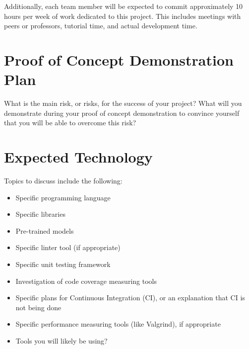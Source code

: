 \documentclass{article}
\begin{document}
\noindent
Additionally, each team member will be expected to commit approximately 10 hours per week of work dedicated to this project. This includes meetings with peers or professors, tutorial time, and actual development time.


\section{Proof of Concept Demonstration Plan}

What is the main risk, or risks, for the success of your project?  What will you
demonstrate during your proof of concept demonstration to convince yourself that
you will be able to overcome this risk?

\section{Expected Technology}



Topics to discuss include the following:

\begin{itemize}
\item Specific programming language
\item Specific libraries
\item Pre-trained models
\item Specific linter tool (if appropriate)
\item Specific unit testing framework
\item Investigation of code coverage measuring tools
\item Specific plans for Continuous Integration (CI), or an explanation that CI
  is not being done
\item Specific performance measuring tools (like Valgrind), if
  appropriate
\item Tools you will likely be using?
\end{itemize}
\end{document}
